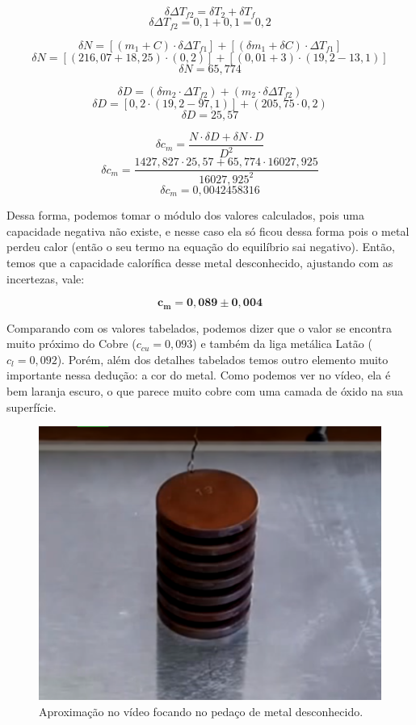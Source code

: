 \[ \delta \Delta T_{f2} = \delta T_2 + \delta T_f \]
\[ \delta \Delta T_{f2} = 0,1 + 0,1 = 0,2 \]

\[ \delta N = [(m_1 + C) \cdot \delta \Delta T_{f1}] + [(\delta m_1 + \delta C) \cdot \Delta T_{f1}] \]
\[ \delta N = [(216,07 + 18,25) \cdot (0,2)] + [(0,01 + 3) \cdot (19,2 - 13,1)] \]
\[ \delta N = 65,774 \]

\[ \delta D = (\delta m_2 \cdot \Delta T_{f2}) + (m_2 \cdot \delta \Delta T_{f2}) \]
\[ \delta D = [0,2 \cdot (19,2 - 97,1)] + (205,75 \cdot 0,2) \]
\[ \delta D = 25,57 \]

\[ \delta c_m = \frac{N \cdot \delta D + \delta N \cdot D}{D^2} \]
\[ \delta c_m = \frac{1427,827 \cdot 25,57 + 65,774 \cdot 16027,925}{16027,925^2} \]
\[ \delta c_m = 0,0042458316 \]

Dessa forma, podemos tomar o módulo dos valores calculados, pois uma capacidade negativa não existe, e nesse caso ela só ficou dessa forma pois o metal perdeu calor (então o seu termo na equação do equilíbrio sai negativo). Então, temos que a capacidade calorífica desse metal desconhecido, ajustando com as incertezas, vale:

\[ \mathbf{c_m = 0,089 \pm 0,004 } \]

Comparando com os valores tabelados, podemos dizer que o valor se encontra muito próximo do Cobre ($c_{cu} = 0,093$) e também da liga metálica Latão ($c_{l} = 0,092$). Porém, além dos detalhes tabelados temos outro elemento muito importante nessa dedução: a cor do metal. Como podemos ver no vídeo, ela é bem laranja escuro, o que parece muito cobre com uma camada de óxido na sua superfície.

\begin{figure}[H]
  \centering
  \includegraphics[scale=0.6]{images/metal.png}
  \caption{Aproximação no vídeo focando no pedaço de metal desconhecido.}
\end{figure}


